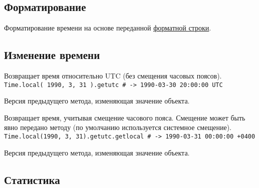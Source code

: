 \subsection*{Форматирование}

\begin{methodlist}
  Форматирование времени на основе переданной \hyperlink{appdatetime}{\underline{форматной строки}}.
\end{methodlist}

\subsection*{Изменение времени}

\begin{methodlist}
  Возвращает время относительно UTC (без смещения часовых поясов). 
  \\\verb!Time.local( 1990, 3, 31 ).getutc # -> 1990-03-30 20:00:00 UTC!
 
  Версия предыдущего метода, изменяющая значение объекта. 

  Возвращает время, учитывая смещение часового пояса. Смещение может быть явно передано методу (по умолчанию используется системное смещение). 
  \\\verb!Time.local(1990, 3, 31).getutc.getlocal # -> 1990-03-31 00:00:00 +0400!
 
  Версия предыдущего метода, изменяющая значение объекта.
\end{methodlist}

\subsection*{Статистика}

